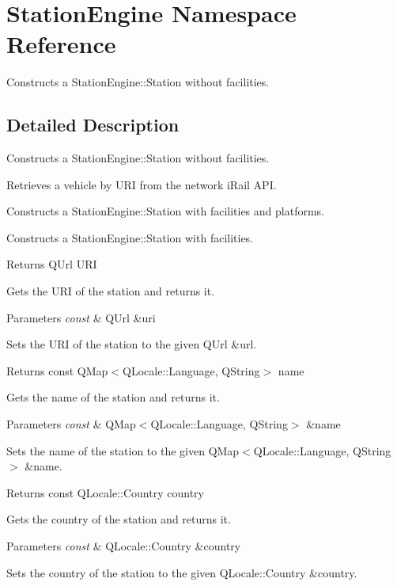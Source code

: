 \hypertarget{namespaceStationEngine}{}\section{Station\+Engine Namespace Reference}
\label{namespaceStationEngine}


Constructs a Station\+Engine\+::\+Station without facilities.  




\subsection{Detailed Description}
Constructs a Station\+Engine\+::\+Station without facilities. 

Retrieves a vehicle by U\+RI from the network i\+Rail A\+PI.

Constructs a Station\+Engine\+::\+Station with facilities and platforms.

Constructs a Station\+Engine\+::\+Station with facilities.

\begin{DoxyReturn}{Returns}
Q\+Url U\+RI
\end{DoxyReturn}
Gets the U\+RI of the station and returns it.


\begin{DoxyParams}{Parameters}
{\em const} & Q\+Url \&uri\\
\hline
\end{DoxyParams}
Sets the U\+RI of the station to the given Q\+Url \&url.

\begin{DoxyReturn}{Returns}
const Q\+Map$<$\+Q\+Locale\+::\+Language, Q\+String$>$ name
\end{DoxyReturn}
Gets the name of the station and returns it.


\begin{DoxyParams}{Parameters}
{\em const} & Q\+Map$<$\+Q\+Locale\+::\+Language, Q\+String$>$ \&name\\
\hline
\end{DoxyParams}
Sets the name of the station to the given Q\+Map$<$\+Q\+Locale\+::\+Language, Q\+String$>$ \&name.

\begin{DoxyReturn}{Returns}
const Q\+Locale\+::\+Country country
\end{DoxyReturn}
Gets the country of the station and returns it.


\begin{DoxyParams}{Parameters}
{\em const} & Q\+Locale\+::\+Country \&country\\
\hline
\end{DoxyParams}
Sets the country of the station to the given Q\+Locale\+::\+Country \&country.

